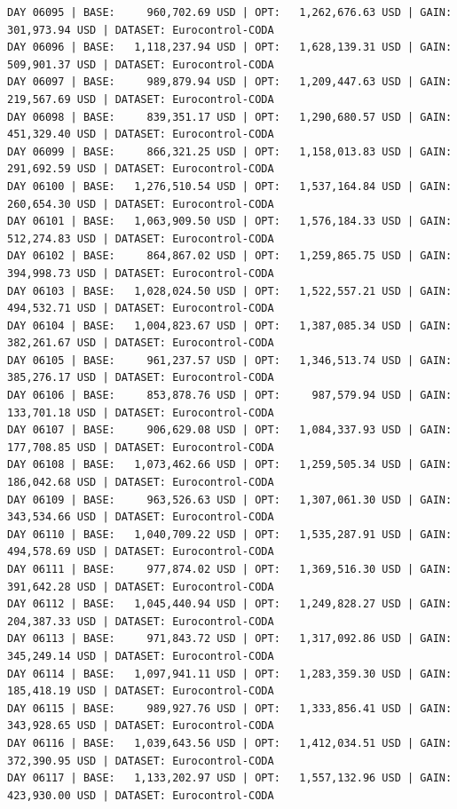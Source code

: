 \documentclass[11pt,a4paper]{article}
\begin{document}
\begin{verbatim}
DAY 06095 | BASE:     960,702.69 USD | OPT:   1,262,676.63 USD | GAIN: 301,973.94 USD | DATASET: Eurocontrol-CODA
DAY 06096 | BASE:   1,118,237.94 USD | OPT:   1,628,139.31 USD | GAIN: 509,901.37 USD | DATASET: Eurocontrol-CODA
DAY 06097 | BASE:     989,879.94 USD | OPT:   1,209,447.63 USD | GAIN: 219,567.69 USD | DATASET: Eurocontrol-CODA
DAY 06098 | BASE:     839,351.17 USD | OPT:   1,290,680.57 USD | GAIN: 451,329.40 USD | DATASET: Eurocontrol-CODA
DAY 06099 | BASE:     866,321.25 USD | OPT:   1,158,013.83 USD | GAIN: 291,692.59 USD | DATASET: Eurocontrol-CODA
DAY 06100 | BASE:   1,276,510.54 USD | OPT:   1,537,164.84 USD | GAIN: 260,654.30 USD | DATASET: Eurocontrol-CODA
DAY 06101 | BASE:   1,063,909.50 USD | OPT:   1,576,184.33 USD | GAIN: 512,274.83 USD | DATASET: Eurocontrol-CODA
DAY 06102 | BASE:     864,867.02 USD | OPT:   1,259,865.75 USD | GAIN: 394,998.73 USD | DATASET: Eurocontrol-CODA
DAY 06103 | BASE:   1,028,024.50 USD | OPT:   1,522,557.21 USD | GAIN: 494,532.71 USD | DATASET: Eurocontrol-CODA
DAY 06104 | BASE:   1,004,823.67 USD | OPT:   1,387,085.34 USD | GAIN: 382,261.67 USD | DATASET: Eurocontrol-CODA
DAY 06105 | BASE:     961,237.57 USD | OPT:   1,346,513.74 USD | GAIN: 385,276.17 USD | DATASET: Eurocontrol-CODA
DAY 06106 | BASE:     853,878.76 USD | OPT:     987,579.94 USD | GAIN: 133,701.18 USD | DATASET: Eurocontrol-CODA
DAY 06107 | BASE:     906,629.08 USD | OPT:   1,084,337.93 USD | GAIN: 177,708.85 USD | DATASET: Eurocontrol-CODA
DAY 06108 | BASE:   1,073,462.66 USD | OPT:   1,259,505.34 USD | GAIN: 186,042.68 USD | DATASET: Eurocontrol-CODA
DAY 06109 | BASE:     963,526.63 USD | OPT:   1,307,061.30 USD | GAIN: 343,534.66 USD | DATASET: Eurocontrol-CODA
DAY 06110 | BASE:   1,040,709.22 USD | OPT:   1,535,287.91 USD | GAIN: 494,578.69 USD | DATASET: Eurocontrol-CODA
DAY 06111 | BASE:     977,874.02 USD | OPT:   1,369,516.30 USD | GAIN: 391,642.28 USD | DATASET: Eurocontrol-CODA
DAY 06112 | BASE:   1,045,440.94 USD | OPT:   1,249,828.27 USD | GAIN: 204,387.33 USD | DATASET: Eurocontrol-CODA
DAY 06113 | BASE:     971,843.72 USD | OPT:   1,317,092.86 USD | GAIN: 345,249.14 USD | DATASET: Eurocontrol-CODA
DAY 06114 | BASE:   1,097,941.11 USD | OPT:   1,283,359.30 USD | GAIN: 185,418.19 USD | DATASET: Eurocontrol-CODA
DAY 06115 | BASE:     989,927.76 USD | OPT:   1,333,856.41 USD | GAIN: 343,928.65 USD | DATASET: Eurocontrol-CODA
DAY 06116 | BASE:   1,039,643.56 USD | OPT:   1,412,034.51 USD | GAIN: 372,390.95 USD | DATASET: Eurocontrol-CODA
DAY 06117 | BASE:   1,133,202.97 USD | OPT:   1,557,132.96 USD | GAIN: 423,930.00 USD | DATASET: Eurocontrol-CODA

\end{verbatim}
\end{document}
